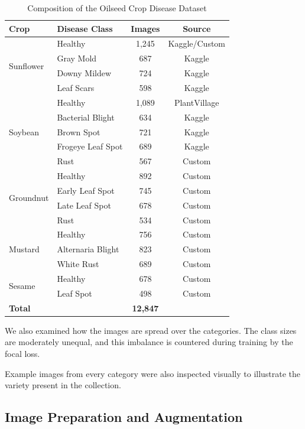 \documentclass[default, iicol]{sn-jnl}
\theoremstyle{thmstyleone}%
\theoremstyle{thmstyletwo}%
\theoremstyle{thmstylethree}%
\begin{document}
\begin{table}[htbp]
\centering
\caption{Composition of the Oilseed Crop Disease Dataset}
\label{tab:dataset}
\begin{tabular}{@{}llcc@{}}
\toprule
\textbf{Crop} & \textbf{Disease Class} & \textbf{Images} & \textbf{Source} \\
\midrule
\multirow{4}{*}{Sunflower} & Healthy & 1,245 & Kaggle/Custom \\
& Gray Mold & 687 & Kaggle \\
& Downy Mildew & 724 & Kaggle \\
& Leaf Scars & 598 & Kaggle \\
\midrule
\multirow{5}{*}{Soybean} & Healthy & 1,089 & PlantVillage \\
& Bacterial Blight & 634 & Kaggle \\
& Brown Spot & 721 & Kaggle \\
& Frogeye Leaf Spot & 689 & Kaggle \\
& Rust & 567 & Custom \\
\midrule
\multirow{4}{*}{Groundnut} & Healthy & 892 & Custom \\
& Early Leaf Spot & 745 & Custom \\
& Late Leaf Spot & 678 & Custom \\
& Rust & 534 & Custom \\
\midrule
\multirow{3}{*}{Mustard} & Healthy & 756 & Custom \\
& Alternaria Blight & 823 & Custom \\
& White Rust & 689 & Custom \\
\midrule
\multirow{2}{*}{Sesame} & Healthy & 678 & Custom \\
& Leaf Spot & 498 & Custom \\
\midrule
\multicolumn{2}{l}{\textbf{Total}} & \textbf{12,847} & \\
\bottomrule
\end{tabular}
\end{table}

We also examined how the images are spread over the categories. The class sizes are moderately unequal, and this imbalance is countered during training by the focal loss.

Example images from every category were also inspected visually to illustrate the variety present in the collection.


\subsection{Image Preparation and Augmentation}
\end{document}
